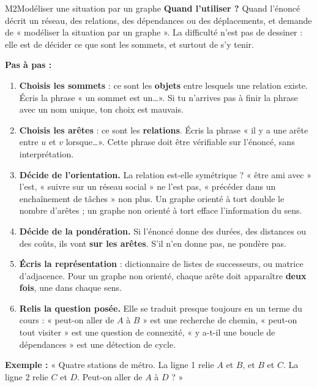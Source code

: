 \begin{fichemethode}{M2}{Modéliser une situation par un graphe}
\textbf{Quand l'utiliser ?} Quand l'énoncé décrit un réseau, des relations, des dépendances ou
des déplacements, et demande de « modéliser la situation par un graphe ». La difficulté n'est
pas de dessiner : elle est de décider ce que sont les sommets, et surtout de s'y tenir.

\textbf{Pas à pas :}
\begin{enumerate}
  \item \textbf{Choisis les sommets} : ce sont les \textbf{objets} entre lesquels une relation
    existe. Écris la phrase « un sommet est un\ldots ». Si tu n'arrives pas à finir la phrase
    avec un nom unique, ton choix est mauvais.
  \item \textbf{Choisis les arêtes} : ce sont les \textbf{relations}. Écris la phrase « il y a
    une arête entre $u$ et $v$ lorsque\ldots ». Cette phrase doit être vérifiable sur
    l'énoncé, sans interprétation.
  \item \textbf{Décide de l'orientation.} La relation est-elle symétrique ? « être ami avec »
    l'est, « suivre sur un réseau social » ne l'est pas, « précéder dans un enchaînement de
    tâches » non plus. Un graphe orienté à tort double le nombre d'arêtes ; un graphe non
    orienté à tort efface l'information du sens.
  \item \textbf{Décide de la pondération.} Si l'énoncé donne des durées, des distances ou des
    coûts, ils vont \textbf{sur les arêtes}. S'il n'en donne pas, ne pondère pas.
  \item \textbf{Écris la représentation} : dictionnaire de listes de successeurs, ou matrice
    d'adjacence. Pour un graphe non orienté, chaque arête doit apparaître \textbf{deux fois},
    une dans chaque sens.
  \item \textbf{Relis la question posée.} Elle se traduit presque toujours en un terme du
    cours : « peut-on aller de $A$ à $B$ » est une recherche de chemin, « peut-on tout
    visiter » est une question de connexité, « y a-t-il une boucle de dépendances » est une
    détection de cycle.
\end{enumerate}

\textbf{Exemple :} « Quatre stations de métro. La ligne 1 relie $A$ et $B$, et $B$ et $C$. La
ligne 2 relie $C$ et $D$. Peut-on aller de $A$ à $D$ ? »


\end{fichemethode}
